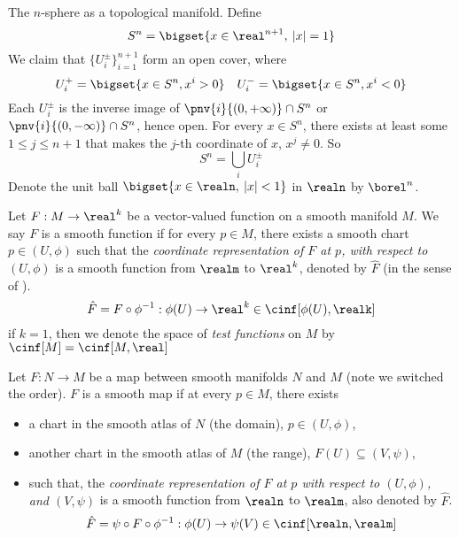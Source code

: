 \documentclass[../main-v2-manifolds.tex]{subfiles}
\begin{document}
\newpage

\begin{example}
    The $n$-sphere as a topological manifold. Define 
\[
    S^n = \bigset{x\in\real^{n+1},\: |x|=1}
\]
We claim that $\{U_i^{\pm}\}_{i=1}^{n+1}$ form an open cover, where
\[
    U_i^+ = \bigset{x\in S^n, x^i>0}\quad U_i^- = \bigset{x\in S^n, x^i<0}
\]
Each $U_i^{\pm}$ is the inverse image of $\pnv{i}{(0,+\infty)}\cap S^n$ or $\pnv{i}{(0,-\infty)}\cap S^n$, hence open. For every $x\in S^n$, there exists at least some $1\leq j\leq n+1$ that makes the $j$-th coordinate of $x$, $x^j\neq 0$. So 
\[
    S^n = \bigcup_{i}U_i^\pm
\]
Denote the unit ball $\bigset{x\in\realn,\: |x|<1}$ in $\realn$ by $\borel^n$. 

\end{example}

\newpage

\newpage


\begin{definition}\label{lee-chp2:test-functions-on-manifolds}
    Let $F: M\to\real^k$ be a vector-valued function on a smooth manifold $M$. We say $F$ is a smooth function if for every $p\in M$, there exists a smooth chart $p\in (U,\phi)$ such that the \emph{coordinate representation of $F$ at $p$, with respect to $(U,\phi)$} is a smooth function from $\realm$ to $\real^k$, denoted by $\hat{F}$ (in the sense of ).
    \[
        \hat{F}=F\circ \phi^{-1}:\phi(U)\to\real^k\in \cinf[\phi(U),\realk]
    \]
    if $k=1$, then we denote the space of \emph{test functions} on $M$ by $\cinf[M]=\cinf[M,\real]$
\end{definition}

\begin{definition}\label{lee-chp2:smooth-maps-between-manifolds-definition}
    Let $F:N\to M$ be a map between smooth manifolds $N$ and $M$ (note we switched the order). $F$ is a smooth map if at every $p\in M$, there exists 
    \begin{itemize}
        \item a chart in the smooth atlas of $N$ (the domain), $p\in (U,\phi)$,
        \item another chart in the smooth atlas of $M$ (the range), $F(U)\subseteq(V,\psi)$,
        \item such that, the \emph{coordinate representation of $F$ at $p$ with respect to $(U,\phi)$, and $(V,\psi)$} is a smooth function from $\realn$ to $\realm$, also denoted by $\hat{F}$.
        \begin{equation}\label{lee-chp2:eq-smooth-map-coordinate-representation}
            \hat{F} = \psi\circ F\circ \phi^{-1}:\phi(U)\to \psi(V)\in \cinf[\realn,\realm]
        \end{equation}
    \end{itemize}
\end{definition}
\end{document}
